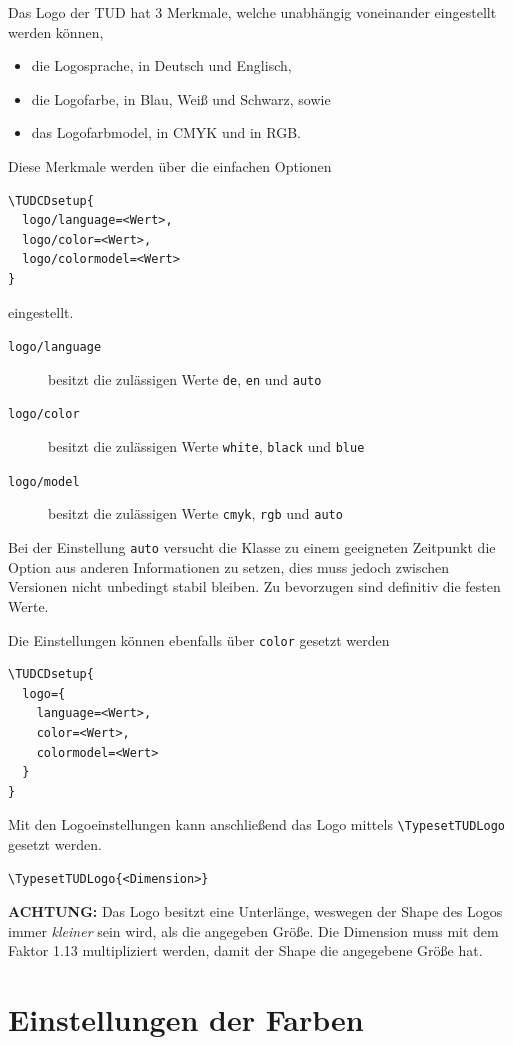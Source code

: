 \documentclass[
  logo={
    color=blue,
    language=de,
    colormodel=rgb
  },
  fontsize=11tudpt,
  usemargin,
  oneside
]{tudcdreprt}
\begin{document}
Das Logo der TUD hat 3 Merkmale, welche unabhängig voneinander eingestellt werden können,
\begin{itemize}
  \item die Logosprache, in Deutsch und Englisch,
  \item die Logofarbe, in Blau, Weiß und Schwarz, sowie
  \item das Logofarbmodel, in CMYK und in RGB.
\end{itemize}
Diese Merkmale werden über die einfachen Optionen
\begin{lstlisting}
\TUDCDsetup{
  logo/language=<Wert>,
  logo/color=<Wert>,
  logo/colormodel=<Wert>
}
\end{lstlisting}
eingestellt.

\begin{description}
  \item[\texttt{logo/language}] besitzt die zulässigen Werte \texttt{de}, \texttt{en} und \texttt{auto}
  \item[\texttt{logo/color}] besitzt die zulässigen Werte \texttt{white}, \texttt{black} und \texttt{blue}
  \item[\texttt{logo/model}] besitzt die zulässigen Werte \texttt{cmyk}, \texttt{rgb} und \texttt{auto}
\end{description}
Bei der Einstellung \texttt{auto} versucht die Klasse zu einem geeigneten Zeitpunkt die Option aus anderen Informationen
zu setzen, dies muss jedoch zwischen Versionen nicht unbedingt stabil bleiben.
Zu bevorzugen sind definitiv die festen Werte.

Die Einstellungen können ebenfalls über \texttt{color} gesetzt werden
\begin{lstlisting}
\TUDCDsetup{
  logo={
    language=<Wert>,
    color=<Wert>,
    colormodel=<Wert>
  }
}
\end{lstlisting}

Mit den Logoeinstellungen kann anschließend das Logo mittels \lstinline|\TypesetTUDLogo| gesetzt werden.
\begin{lstlisting}
\TypesetTUDLogo{<Dimension>}
\end{lstlisting}

\textbf{ACHTUNG:} Das Logo besitzt eine Unterlänge, weswegen der Shape des Logos immer \emph{kleiner} sein wird,
als die angegeben Größe. Die Dimension muss mit dem Faktor \num{1.13} multipliziert werden, damit der Shape die angegebene Größe hat.


\section{Einstellungen der Farben}
\end{document}
